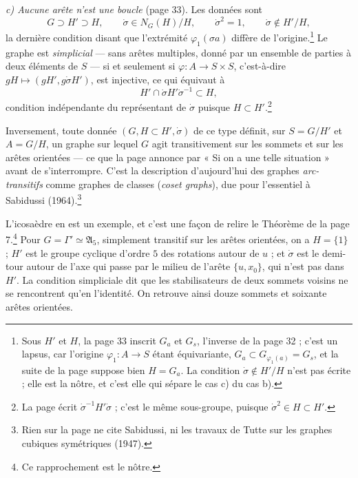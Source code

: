 \documentclass[11pt,a4paper]{article}
\begin{document}
\emph{c) Aucune arête n'est une boucle} (page 33). Les données sont
\[
G \supset H' \supset H,\qquad \dot\sigma \in N_G(H)/H,\qquad \dot\sigma^{2} = 1,\qquad \dot\sigma \notin H'/H,
\]
la dernière condition disant que l'extrémité $\varphi_1(\sigma a)$ diffère de
l'origine.\footnote{Sous $H'$ et $H$, la page 33 inscrit $G_a$ et $G_s$,
l'inverse de la page 32 ; c'est un lapsus, car l'origine
$\varphi_1 : A \to S$ étant équivariante, $G_a \subset G_{\varphi_1(a)} = G_s$,
et la suite de la page suppose bien $H = G_a$. La condition
$\dot\sigma \notin H'/H$ n'est pas écrite ; elle est la nôtre, et c'est elle
qui sépare le cas c) du cas b).} Le graphe est \emph{simplicial} --- sans
arêtes multiples, donné par un ensemble de parties à deux éléments de $S$ ---
si et seulement si $\varphi : A \to S \times S$, c'est-à-dire
$gH \mapsto (gH', g\dot\sigma H')$, est injective, ce qui équivaut à
\[
H' \cap \dot\sigma H' \dot\sigma^{-1} \subset H,
\]
condition indépendante du représentant de $\dot\sigma$ puisque
$H \subset H'$.\footnote{La page écrit $\dot\sigma^{-1}H'\dot\sigma$ ; c'est le
même sous-groupe, puisque $\dot\sigma^{2} \in H \subset H'$.}

Inversement, toute donnée $(G, H \subset H', \dot\sigma)$ de ce type définit,
sur $S = G/H'$ et $A = G/H$, un graphe sur lequel $G$ agit transitivement
sur les sommets et sur les arêtes orientées --- ce que la page annonce par
« Si on a une telle situation » avant de s'interrompre. C'est la description
d'aujourd'hui des graphes \emph{arc-transitifs} comme graphes de classes
(\emph{coset graphs}), due pour l'essentiel à Sabidussi
(1964).\footnote{Rien sur la page ne cite Sabidussi, ni les travaux de Tutte
sur les graphes cubiques symétriques (1947).}

L'icosaèdre en est un exemple, et c'est une façon de relire le Théorème de la
page 7.\footnote{Ce rapprochement est le nôtre.} Pour $G = \Gamma' \simeq \mathfrak{A}_5$,
simplement transitif sur les arêtes orientées, on a $H = \{1\}$ ; $H'$ est le
groupe cyclique d'ordre $5$ des rotations autour de $u$ ; et $\dot\sigma$
est le demi-tour autour de l'axe qui passe par le milieu de l'arête
$\{u, x_0\}$, qui n'est pas dans $H'$. La condition simpliciale dit que les
stabilisateurs de deux sommets voisins ne se rencontrent qu'en l'identité.
On retrouve ainsi douze sommets et soixante arêtes orientées.
\end{document}
